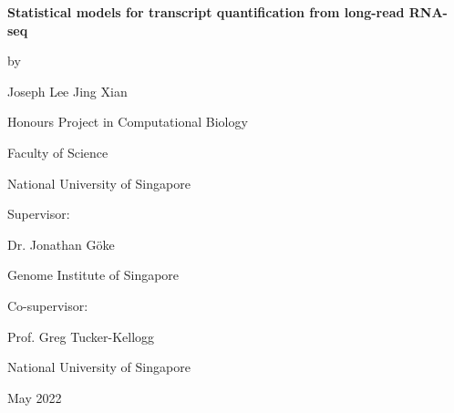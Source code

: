 
\begin{titlepage}
   \begin{center}
       \vspace*{1cm}
       
       \Large
       \textbf{Statistical models for transcript quantification from long-read RNA-seq}
       
       \vspace{1.5cm}
       
       \large
       by\\
       
       \vspace{0.25cm}
       
       Joseph Lee Jing Xian
       
       \vspace{1.5cm}
       
       Honours Project in Computational Biology
       
       \vspace{0.25cm}
       
       Faculty of Science
       
       \vspace{0.25cm}
       
       National University of Singapore
       
       \vspace{1.5cm}
       
       Supervisor:
       
       \vspace{0.25cm}
       
       Dr. Jonathan Göke
       
       \vspace{0.25cm}
       
       Genome Institute of Singapore
       
       \vspace{1.5cm}
       
       Co-supervisor:
       
       \vspace{0.25cm}
       
       Prof. Greg Tucker-Kellogg
       
       \vspace{0.25cm}
       
       National University of Singapore
       
       \vfill
       
       May 2022

   \end{center}
\end{titlepage}